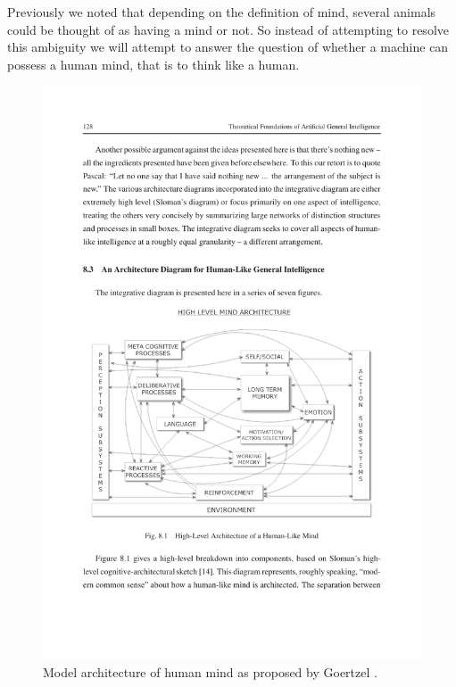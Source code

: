 \documentclass[11pt]{article}
\begin{document}
Previously we noted that depending on the definition of mind, several animals could be thought of as having a mind or not. So instead of attempting to resolve this ambiguity we will attempt 
to answer the question of whether a machine can possess a human mind, that is to think like a human.

\begin{figure}
\centering
\includegraphics[scale=1.0]{mindStructure.pdf}
\caption{Model architecture of human mind as proposed by Goertzel \cite{goertzel2012agi}.}
\label{fig:mindArchi}
\end{figure}
\end{document}
